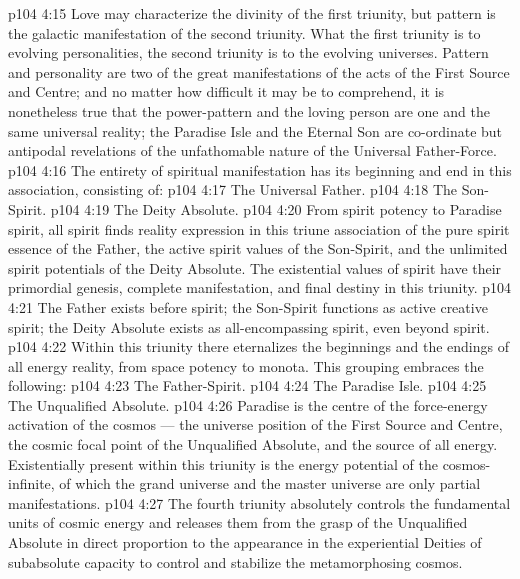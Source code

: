 \vs p104 4:15 Love may characterize the divinity of the first triunity, but pattern is the galactic manifestation of the second triunity. What the first triunity is to evolving personalities, the second triunity is to the evolving universes. Pattern and personality are two of the great manifestations of the acts of the First Source and Centre; and no matter how difficult it may be to comprehend, it is nonetheless true that the power\hyp{}pattern and the loving person are one and the same universal reality; the Paradise Isle and the Eternal Son are co\hyp{}ordinate but antipodal revelations of the unfathomable nature of the Universal Father\hyp{}Force.
\vs p104 4:16 \pc {} The entirety of spiritual manifestation has its beginning and end in this association, consisting of:
\vs p104 4:17 \bibnobreakspace The Universal Father.
\vs p104 4:18 \bibnobreakspace The Son\hyp{}Spirit.
\vs p104 4:19 \bibnobreakspace The Deity Absolute.
\vs p104 4:20 \pc From spirit potency to Paradise spirit, all spirit finds reality expression in this triune association of the pure spirit essence of the Father, the active spirit values of the Son\hyp{}Spirit, and the unlimited spirit potentials of the Deity Absolute. The existential values of spirit have their primordial genesis, complete manifestation, and final destiny in this triunity.
\vs p104 4:21 The Father exists before spirit; the Son\hyp{}Spirit functions as active creative spirit; the Deity Absolute exists as all\hyp{}encompassing spirit, even beyond spirit.
\vs p104 4:22 \pc {} With\-in this triunity there eternalizes the beginnings and the endings of all energy reality, from space potency to monota. This grouping embraces the following:
\vs p104 4:23 \bibnobreakspace The Father\hyp{}Spirit.
\vs p104 4:24 \bibnobreakspace The Paradise Isle.
\vs p104 4:25 \bibnobreakspace The Unqualified Absolute.
\vs p104 4:26 \pc Paradise is the centre of the force\hyp{}energy activation of the cosmos --- the universe position of the First Source and Centre, the cosmic focal point of the Unqualified Absolute, and the source of all energy. Existentially present within this triunity is the energy potential of the cosmos\hyp{}infinite, of which the grand universe and the master universe are only partial manifestations.
\vs p104 4:27 The fourth triunity absolutely controls the fundamental units of cosmic energy and releases them from the grasp of the Unqualified Absolute in direct proportion to the appearance in the experiential Deities of subabsolute capacity to control and stabilize the metamorphosing cosmos.
